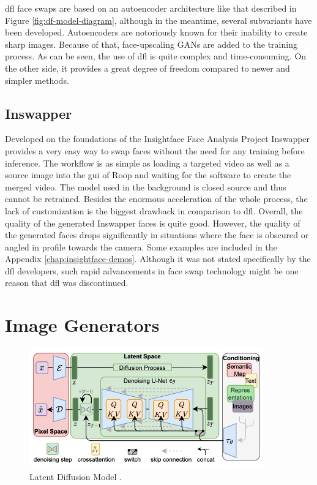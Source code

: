 \documentclass[
  a4paper,  %
  twoside,  %
  bibliography=totoc,
  headsepline,
  cleardoublepage=empty,
  parskip=half,
  draft=false
]{scrbook}
\begin{document}
\gls{dfl} face swaps are based on an autoencoder architecture like that described in Figure \ref{fig:df-model-diagram}, although in the meantime, several subvariants have been developed. Autoencoders are notoriously known for their inability to create sharp images. Because of that, face-upscaling GANs are added to the training process. As can be seen, the use of \gls{dfl} is quite complex and time-consuming. On the other side, it provides a great degree of freedom compared to newer and simpler methods.

\subsection{Inswapper}
\label{sec:roop}
Developed on the foundations of the Insightface Face Analysis Project \cite{insightfaceInsightFaceWebsite} Inswapper provides a very easy way to swap faces without the need for any training before inference. The workflow is as simple as loading a targeted video as well as a source image into the \gls{gui} of Roop \cite{sangwanRoop2023} and waiting for the software to create the merged video. The model used in the background is closed source and thus cannot be retrained. Besides the enormous acceleration of the whole process, the lack of customization is the biggest drawback in comparison to \gls{dfl}. Overall, the quality of the generated Inswapper faces is quite good. However, the quality of the generated faces drops significantly in situations where the face is obscured or angled in profile towards the camera. Some examples are included in the Appendix \ref{chap:insightface-demos}. Although it was not stated specifically by the \gls{dfl} developers, such rapid advancements in face swap technology might be one reason that \gls{dfl} was discontinued.

\section{Image Generators}
\label{sec:stable-diffusion-bg}
\begin{figure}[h]
  \centering
  \includegraphics[width=0.9\textwidth]{./graphics/latent-diffusion.png}
  \caption{Latent Diffusion Model \cite{rombachHighResolutionImageSynthesis2022}.}
  \label{fig:ldm-arch}
\end{figure}
\end{document}
